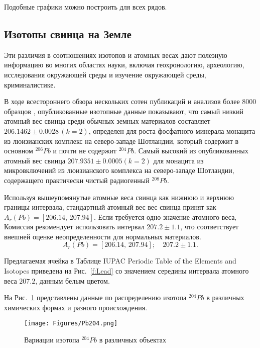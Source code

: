 \documentclass[a5paper,openany]{book}
\begin{document}
Подобные графики можно построить для всех рядов.


\subsection{Изотопы свинца на Земле} 

Эти различия в соотношениях изотопов и атомных весах дают полезную информацию во многих областях науки, включая геохронологию, археологию, исследования окружающей среды и изучение окружающей среды, криминалистике.



В ходе всестороннего обзора нескольких сотен публикаций и анализов более 8000 образцов \cite{IUPACLead},
опубликованные изотопные данные показывают, что самый низкий атомный вес свинца среди обычных земных материалов составляет
$206.1462\pm 0.0028 \, (k = 2)$,
определен для роста фосфатного минерала монацита из люизианских
комплекс на северо-западе Шотландии, который содержит в основном $^{206}Pb$ и почти не содержит $^{204}Pb$. Самый высокий из опубликованных
атомный вес свинца $207.9351 \pm 0.0005 (k = 2)$ для монацита из микровключений 
из люизианского комплекса на северо-западе Шотландии, содержащего практически чистый радиогенный $^{208}Pb$. 

Используя вышеупомянутые атомные веса свинца как нижнюю и верхнюю границы интервала, стандартный атомный вес вес свинца принят как 
$A_r(Pb) = [206.14,\, 207.94]$. Если требуется одно значение атомного веса, Комиссия рекомендует
использовать интервал $207.2 \pm 1.1$, что соответствует внешней оценке неопределенности
для нормальных материалов.
\begin{equation}
A_r(Pb) = [206.14, \, 207.94]; \quad 207.2 \pm 1.1.
\end{equation}

Предлагаемая ячейка в Таблице IUPAC Periodic Table of the Elements and Isotopes \cite{IPTEI} приведена на Рис.~\ref{f:Lead} со значением середины интервала атомного веса $207.2$, данным белым цветом. 


На Рис.~\ref{f:204LeadVariation} представлены данные по распределению изотопа $^{204}Pb$ в различных химических формах и разного происхождения.
\begin{figure}[ht] 
	\centering\small
	\texttt{[image: Figures/Pb204.png]}
	\caption{Вариации изотопа $^{204}Pb$ в различных объектах} 
	\label{f:204LeadVariation}
\end{figure}
\end{document}
